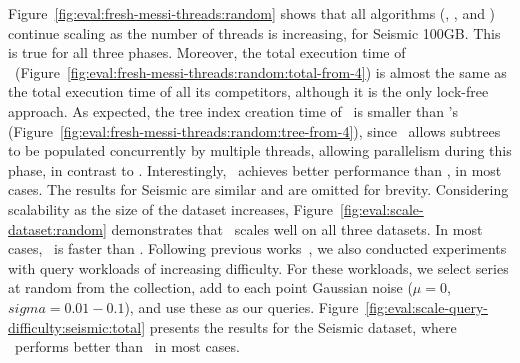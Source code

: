 Figure~\ref{fig:eval:fresh-messi-threads:random} shows that all algorithms
(\Fresh, \MESSI, and \MESSIenh) continue scaling as the number of threads is increasing,
for Seismic 100GB. This is true for all three phases. 
Moreover, the total execution time of \Fresh\ 
(Figure~\ref{fig:eval:fresh-messi-threads:random:total-from-4})
is almost the same as the total execution time of all its competitors, although it is the
only lock-free approach. 
As expected, the tree index creation time of \Fresh\ is smaller than \MESSI's 
(Figure~\ref{fig:eval:fresh-messi-threads:random:tree-from-4}), since \Fresh\ allows
subtrees to be populated concurrently by multiple threads, allowing parallelism during
this phase, in contrast to \MESSI. 
Interestingly, \Fresh\ achieves better performance than \MESSIenh, in most cases.
The results for Seismic are similar and are omitted for brevity.
Considering scalability as the size of the dataset increases, 
Figure~\ref{fig:eval:scale-dataset:random} demonstrates that \Fresh\ scales well
on all three datasets. In most cases, \Fresh\ is faster than \MESSI.
Following previous works~\cite{DBLP:journals/vldb/ZoumpatianosLIP18,PFP21-I},
we also conducted experiments with query workloads of increasing difficulty.
For these workloads, we select series at random from the collection, add to each point
Gaussian noise ($\mu = 0$, $sigma = 0.01-0.1$), and use these as our queries. 
Figure~\ref{fig:eval:scale-query-difficulty:seismic:total} presents the results for
the Seismic dataset, where \Fresh\ performs better than \MESSI\ in most cases.


